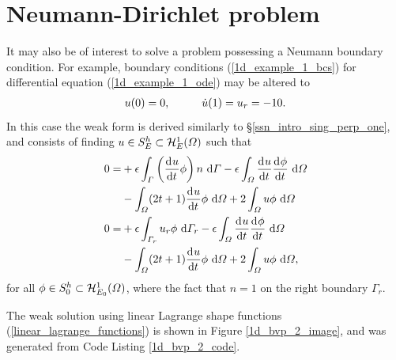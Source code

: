 
  \section{Neumann-Dirichlet problem}

  It may also be of interest to solve a problem possessing a Neumann boundary condition.  For example, boundary conditions (\ref{1d_example_1_bcs}) for differential equation (\ref{1d_example_1_ode}) may be altered to 
  \begin{align}
    \label{1d_example_2_bcs}
    u(0) = 0, \hspace{10mm} \dot{u}(1) = u_r = -10.
  \end{align}
  In this case the weak form is derived similarly to \S \ref{ssn_intro_sing_perp_one}, and consists of finding $u \in S_E^h \subset \mathcal{H}_E^1(\varOmega)$ such that
  \begin{align*}
    0 = &+\epsilon \int_{\varGamma} \left( \frac{\mathrm{d}^{} u}{\mathrm{d} t^{} } \phi \right) n \ \mathrm{d}\varGamma - \epsilon \int_{\varOmega} \frac{\mathrm{d}^{} u}{\mathrm{d} t^{} } \frac{\mathrm{d}^{} \phi}{\mathrm{d} t^{} } \ \mathrm{d}\varOmega \\
    &- \int_{\varOmega} (2t + 1) \frac{\mathrm{d}^{} u}{\mathrm{d} t^{} } \phi \ \mathrm{d}\varOmega + 2\int_{\varOmega} u \phi \ \mathrm{d}\varOmega \\
    0 = &+\epsilon \int_{\varGamma_r} u_r \phi \ \mathrm{d}\varGamma_r - \epsilon \int_{\varOmega} \frac{\mathrm{d}^{} u}{\mathrm{d} t^{} } \frac{\mathrm{d}^{} \phi}{\mathrm{d} t^{} } \ \mathrm{d}\varOmega \\
    &- \int_{\varOmega} (2t + 1) \frac{\mathrm{d}^{} u}{\mathrm{d} t^{} } \phi \ \mathrm{d}\varOmega + 2\int_{\varOmega} u \phi \ \mathrm{d}\varOmega,
  \end{align*}
  for all $\phi \in S_0^h \subset \mathcal{H}_{E_0}^1(\varOmega)$, where the fact that $n = 1$ on the right boundary $\Gamma_r$.
    
    The weak solution using linear Lagrange shape functions (\ref{linear_lagrange_functions}) is shown in Figure \ref{1d_bvp_2_image}, and was generated from Code Listing \ref{1d_bvp_2_code}.


